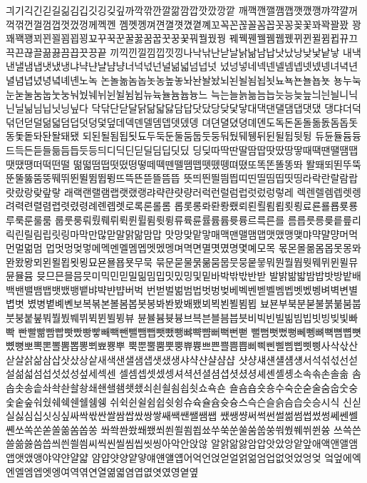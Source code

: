 긔기긱긴긷길긺김깁깃깅깆깊까깍깎깐깔깖깜깝깟깠깡깥
깨깩깬깰깸깹깻깼깽꺄꺅꺌꺼꺽꺾껀껄껌껍껏껐껑께껙껜
껨껫껭껴껸껼꼇꼈꼍꼐꼬꼭꼰꼲꼴꼼꼽꼿꽁꽂꽃꽈꽉꽐꽜
꽝꽤꽥꽹꾀꾄꾈꾐꾑꾕꾜꾸꾹꾼꿀꿇꿈꿉꿋꿍꿎꿔꿜꿨꿩
꿰꿱꿴꿸뀀뀁뀄뀌뀐뀔뀜뀝뀨끄끅끈끊끌끎끓끔끕끗끙끝
끼끽낀낄낌낍낏낑나낙낚난낟날낡낢남납낫났낭낮낯낱낳
내낵낸낼냄냅냇냈냉냐냑냔냘냠냥너넉넋넌널넒넓넘넙넛
넜넝넣네넥넨넬넴넵넷넸넹녀녁년녈념녑녔녕녘녜녠노녹
논놀놂놈놉놋농높놓놔놘놜놨뇌뇐뇔뇜뇝뇟뇨뇩뇬뇰뇹뇻
뇽누눅눈눋눌눔눕눗눙눠눴눼뉘뉜뉠뉨뉩뉴뉵뉼늄늅늉느
늑는늘늙늚늠늡늣능늦늪늬늰늴니닉닌닐닒님닙닛닝닢다
닥닦단닫달닭닮닯닳담답닷닸당닺닻닿대댁댄댈댐댑댓댔
댕댜더덕덖던덛덜덞덟덤덥덧덩덫덮데덱덴델뎀뎁뎃뎄뎅
뎌뎐뎔뎠뎡뎨뎬도독돈돋돌돎돐돔돕돗동돛돝돠돤돨돼됐
되된될됨됩됫됴두둑둔둘둠둡둣둥둬뒀뒈뒝뒤뒨뒬뒵뒷뒹
듀듄듈듐듕드득든듣들듦듬듭듯등듸디딕딘딛딜딤딥딧딨
딩딪따딱딴딸땀땁땃땄땅땋때땍땐땔땜땝땟땠땡떠떡떤떨
떪떫떰떱떳떴떵떻떼떽뗀뗄뗌뗍뗏뗐뗑뗘뗬또똑똔똘똥똬
똴뙈뙤뙨뚜뚝뚠뚤뚫뚬뚱뛔뛰뛴뛸뜀뜁뜅뜨뜩뜬뜯뜰뜸뜹
뜻띄띈띌띔띕띠띤띨띰띱띳띵라락란랄람랍랏랐랑랒랖랗
래랙랜랠램랩랫랬랭랴략랸럇량러럭런럴럼럽럿렀렁렇레
렉렌렐렘렙렛렝려력련렬렴렵렷렸령례롄롑롓로록론롤롬
롭롯롱롸롼뢍뢨뢰뢴뢸룀룁룃룅료룐룔룝룟룡루룩룬룰룸
룹룻룽뤄뤘뤠뤼뤽륀륄륌륏륑류륙륜률륨륩륫륭르륵른를
름릅릇릉릊릍릎리릭린릴림립릿링마막만많맏말맑맒맘맙
맛망맞맡맣매맥맨맬맴맵맷맸맹맺먀먁먈먕머먹먼멀멂멈
멉멋멍멎멓메멕멘멜멤멥멧멨멩며멱면멸몃몄명몇몌모목
몫몬몰몲몸몹못몽뫄뫈뫘뫙뫼묀묄묍묏묑묘묜묠묩묫무묵
묶문묻물묽묾뭄뭅뭇뭉뭍뭏뭐뭔뭘뭡뭣뭬뮈뮌뮐뮤뮨뮬뮴
뮷므믄믈믐믓미믹민믿밀밂밈밉밋밌밍및밑바박밖밗반받
발밝밞밟밤밥밧방밭배백밴밸뱀뱁뱃뱄뱅뱉뱌뱍뱐뱝버벅
번벋벌벎범법벗벙벚베벡벤벧벨벰벱벳벴벵벼벽변별볍볏
볐병볕볘볜보복볶본볼봄봅봇봉봐봔봤봬뵀뵈뵉뵌뵐뵘뵙
뵤뵨부북분붇불붉붊붐붑붓붕붙붚붜붤붰붸뷔뷕뷘뷜뷩뷰
뷴뷸븀븃븅브븍븐블븜븝븟비빅빈빌빎빔빕빗빙빚빛빠빡
빤빨빪빰빱빳빴빵빻빼빽뺀뺄뺌뺍뺏뺐뺑뺘뺙뺨뻐뻑뻔뻗
뻘뻠뻣뻤뻥뻬뼁뼈뼉뼘뼙뼛뼜뼝뽀뽁뽄뽈뽐뽑뽕뾔뾰뿅뿌
뿍뿐뿔뿜뿟뿡쀼쁑쁘쁜쁠쁨쁩삐삑삔삘삠삡삣삥사삭삯산
삳살삵삶삼삽삿샀상샅새색샌샐샘샙샛샜생샤샥샨샬샴샵
샷샹섀섄섈섐섕서석섞섟선섣설섦섧섬섭섯섰성섶세섹센
셀셈셉셋셌셍셔셕션셜셤셥셧셨셩셰셴셸솅소속솎손솔솖
솜솝솟송솥솨솩솬솰솽쇄쇈쇌쇔쇗쇘쇠쇤쇨쇰쇱쇳쇼쇽숀
숄숌숍숏숑수숙순숟술숨숩숫숭숯숱숲숴쉈쉐쉑쉔쉘쉠쉥
쉬쉭쉰쉴쉼쉽쉿슁슈슉슐슘슛슝스슥슨슬슭슴습슷승시식
신싣실싫심십싯싱싶싸싹싻싼쌀쌈쌉쌌쌍쌓쌔쌕쌘쌜쌤쌥
쌨쌩썅써썩썬썰썲썸썹썼썽쎄쎈쎌쏀쏘쏙쏜쏟쏠쏢쏨쏩쏭
쏴쏵쏸쐈쐐쐤쐬쐰쐴쐼쐽쑈쑤쑥쑨쑬쑴쑵쑹쒀쒔쒜쒸쒼쓩
쓰쓱쓴쓸쓺쓿씀씁씌씐씔씜씨씩씬씰씸씹씻씽아악안앉않
알앍앎앓암압앗았앙앝앞애액앤앨앰앱앳앴앵야약얀얄얇
얌얍얏양얕얗얘얜얠얩어억언얹얻얼얽얾엄업없엇었엉엊
엌엎에엑엔엘엠엡엣엥여역엮연열엶엷염엽엾엿였영옅옆
